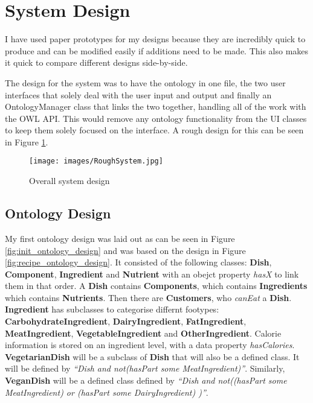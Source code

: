 \section{System Design}

I have used paper prototypes \cite{snyder2003paper} for my designs because they are incredibly quick to produce and can be modified easily if additions need to be made. This also makes it quick to compare different designs side-by-side.

The design for the system was to have the ontology in one file, the two user interfaces that solely deal with the user input and output and finally an OntologyManager class that links the two together, handling all of the work with the OWL API. This would remove any ontology functionality from the UI classes to keep them solely focused on the interface. A rough design for this can be seen in Figure \ref{fig:overall_system_design}.

\begin{figure}[h]
    \centering
    \captionsetup{justification=centering}
    \texttt{[image: images/RoughSystem.jpg]}
    \caption{Overall system design}
    \label{fig:overall_system_design}
\end{figure}

\subsection{Ontology Design}

My first ontology design was laid out as can be seen in Figure \ref{fig:init_ontology_design} and was based on the design in Figure \ref{fig:recipe_ontology_design}. It consisted of the following classes: \textbf{Dish}, \textbf{Component}, \textbf{Ingredient} and \textbf{Nutrient} with an obejct property \textit{hasX} to link them in that order. A \textbf{Dish} contains \textbf{Components}, which contains \textbf{Ingredients} which contains \textbf{Nutrients}. Then there are \textbf{Customers}, who \textit{canEat} a \textbf{Dish}. \textbf{Ingredient} has subclasses to categorise differnt footypes: \textbf{CarbohydrateIngredient}, \textbf{DairyIngredient}, \textbf{FatIngredient}, \textbf{MeatIngredient}, \textbf{VegetableIngredient} and \textbf{OtherIngredient}. Calorie information is stored on an ingredient level, with a data property \textit{hasCalories}. \textbf{VegetarianDish} will be a subclass of \textbf{Dish} that will also be a defined class. It will be defined by \textit{ ``Dish and not(hasPart some MeatIngredient)''}. Similarly, \textbf{VeganDish} will be a defined class defined by \textit{ ``Dish and not((hasPart some MeatIngredient) or (hasPart some DairyIngredient) )''}.

